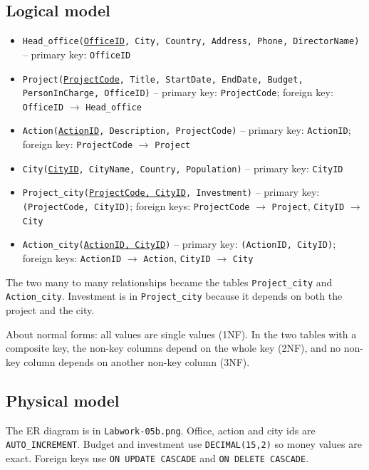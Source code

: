 \documentclass[11pt,a4paper]{article}
\begin{document}
\subsection{Logical model}
\begin{itemize}
    \item \texttt{Head\_office(\underline{OfficeID}, City, Country, Address, Phone, DirectorName)} -- primary key: \texttt{OfficeID}
    \item \texttt{Project(\underline{ProjectCode}, Title, StartDate, EndDate, Budget, PersonInCharge, OfficeID)} -- primary key: \texttt{ProjectCode}; foreign key: \texttt{OfficeID} $\rightarrow$ \texttt{Head\_office}
    \item \texttt{Action(\underline{ActionID}, Description, ProjectCode)} -- primary key: \texttt{ActionID}; foreign key: \texttt{ProjectCode} $\rightarrow$ \texttt{Project}
    \item \texttt{City(\underline{CityID}, CityName, Country, Population)} -- primary key: \texttt{CityID}
    \item \texttt{Project\_city(\underline{ProjectCode, CityID}, Investment)} -- primary key: \texttt{(ProjectCode, CityID)}; foreign keys: \texttt{ProjectCode} $\rightarrow$ \texttt{Project}, \texttt{CityID} $\rightarrow$ \texttt{City}
    \item \texttt{Action\_city(\underline{ActionID, CityID})} -- primary key: \texttt{(ActionID, CityID)}; foreign keys: \texttt{ActionID} $\rightarrow$ \texttt{Action}, \texttt{CityID} $\rightarrow$ \texttt{City}
\end{itemize}

The two many to many relationships became the tables \texttt{Project\_city} and \texttt{Action\_city}. Investment is in \texttt{Project\_city} because it depends on both the project and the city.

About normal forms: all values are single values (1NF). In the two tables with a composite key, the non-key columns depend on the whole key (2NF), and no non-key column depends on another non-key column (3NF).

\subsection{Physical model}
The ER diagram is in \texttt{Labwork-05b.png}. Office, action and city ids are \texttt{AUTO\_INCREMENT}. Budget and investment use \texttt{DECIMAL(15,2)} so money values are exact. Foreign keys use \texttt{ON UPDATE CASCADE} and \texttt{ON DELETE CASCADE}.
\end{document}
